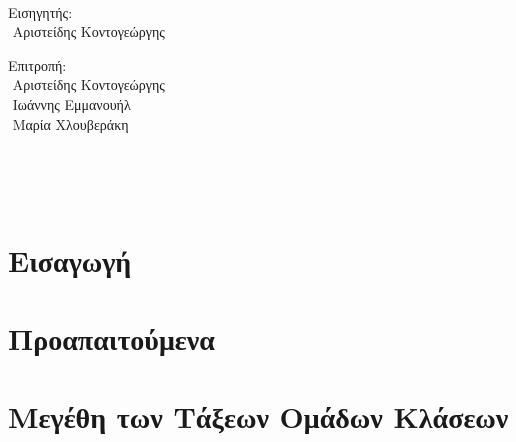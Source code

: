 \documentclass{report}
\begin{document}
\ %
\thispagestyle{empty}

\newpage



\begin{center}
	\vspace*{1.5cm}

	\Large
	Εισηγητής:\\
	$ $\newline
	Αριστείδης Κοντογεώργης

	\vfill 

	\large
	Επιτροπή:\\
	$ $\newline
	Αριστείδης Κοντογεώργης\\
	$ $\newline
	Ιωάννης Εμμανουήλ\\
	$ $\newline
	Μαρία Χλουβεράκη

	\vspace*{1.5cm}
\end{center}
\thispagestyle{empty} %
\pagebreak

\newpage 

\ %
\thispagestyle{empty}
\newpage

\vspace*{1.5cm}

\thispagestyle{empty}

\newpage 

\ %
\thispagestyle{empty}
\newpage


\tableofcontents
\thispagestyle{empty}
\pagebreak
\chapter{Εισαγωγή}



\chapter{Προαπαιτούμενα}









\chapter{Μεγέθη των Τάξεων Ομάδων Κλάσεων}
\end{document}
